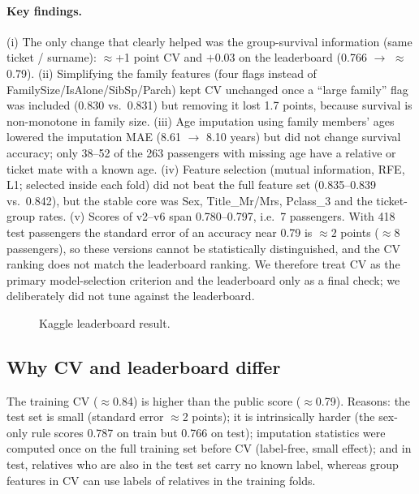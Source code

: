 \documentclass[10pt,twocolumn]{article}
\begin{document}
\paragraph{Key findings.}
(i) The only change that clearly helped was the group-survival information (same ticket / surname): $\approx$+1 point CV and $+0.03$ on the leaderboard (0.766 $\to$ $\approx$0.79).
(ii) Simplifying the family features (four flags instead of FamilySize/IsAlone/SibSp/Parch) kept CV unchanged once a ``large family'' flag was included (0.830 vs.\ 0.831) but removing it lost 1.7 points, because survival is non-monotone in family size.
(iii) Age imputation using family members' ages lowered the imputation MAE (8.61 $\to$ 8.10 years) but did not change survival accuracy; only 38--52 of the 263 passengers with missing age have a relative or ticket mate with a known age.
(iv) Feature selection (mutual information, RFE, L1; selected inside each fold) did not beat the full feature set (0.835--0.839 vs.\ 0.842), but the stable core was Sex, Title\_Mr/Mrs, Pclass\_3 and the ticket-group rates.
(v) Scores of v2--v6 span 0.780--0.797, i.e.\ 7 passengers. With 418 test passengers the standard error of an accuracy near 0.79 is $\approx 2$ points ($\approx 8$ passengers), so these versions cannot be statistically distinguished, and the CV ranking does not match the leaderboard ranking. We therefore treat CV as the primary model-selection criterion and the leaderboard only as a final check; we deliberately did not tune against the leaderboard.
\begin{figure}[t]\centering
  \caption{Kaggle leaderboard result.}
\end{figure}

\subsection{Why CV and leaderboard differ}
The training CV ($\approx$0.84) is higher than the public score ($\approx$0.79). Reasons: the test set is small (standard error $\approx$2 points); it is intrinsically harder (the sex-only rule scores 0.787 on train but 0.766 on test); imputation statistics were computed once on the full training set before CV (label-free, small effect); and in test, relatives who are also in the test set carry no known label, whereas group features in CV can use labels of relatives in the training folds.
\end{document}
